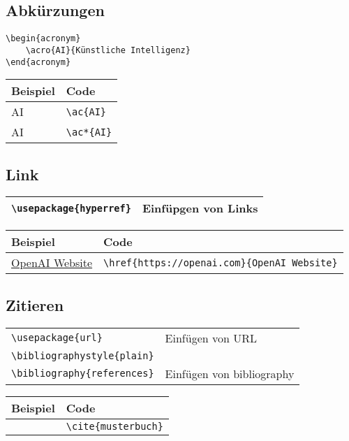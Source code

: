     \subsection{Abkürzungen}

    \begin{verbatim}
\begin{acronym}
    \acro{AI}{Künstliche Intelligenz}
\end{acronym}        
    \end{verbatim}

    \begin{tabular}{|p{}|p{}|}
        \hline
        \textbf{Beispiel} & \textbf{Code} \\
        \hline
        \ac{AI} & \texttt{\textbackslash ac\{AI\}} \\ 
        \ac*{AI} & \texttt{\textbackslash ac*\{AI\}} \\ 
        \hline
    \end{tabular}


    \subsection{Link}

    \begin{tabular}{|p{}|p{}|}
        \hline
        \texttt{\textbackslash usepackage\{hyperref\}} & Einfüpgen von Links \\
        \hline
    \end{tabular}

    \vspace{0.5cm}

    \begin{tabular}{|p{}|p{}|}
        \hline
        \textbf{Beispiel} & \textbf{Code} \\
        \hline
        \href{https://openai.com}{OpenAI Website} & \texttt{\textbackslash href\{https://openai.com\}\{OpenAI Website\}} \\ 
        \hline
    \end{tabular}

    \subsection{Zitieren}

    \begin{tabular}{|p{}|p{}|}
        \hline
        \texttt{\textbackslash usepackage\{url\}} & Einfügen von URL \\
        \texttt{\textbackslash bibliographystyle\{plain\}} &  \\
        \texttt{\textbackslash bibliography\{references\}} & Einfügen von bibliography \\
        \hline
    \end{tabular}

    \vspace{0.5cm}

    \begin{tabular}{|p{}|p{}|}
        \hline
        \textbf{Beispiel} & \textbf{Code} \\
        \hline
        \cite{musterbuch} & \texttt{\textbackslash cite\{musterbuch\}} \\ 
        \hline
    \end{tabular}   
    

